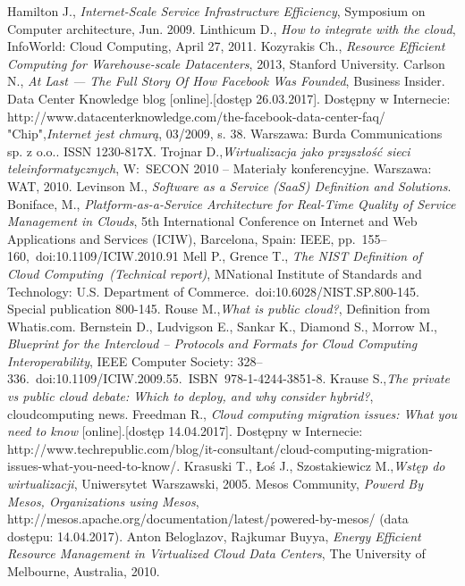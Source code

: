 \documentclass[10pt,a4paper,titlepage,twoside]{report}
\begin{document}
\begin{thebibliography}{99}
Hamilton J., \textit{Internet-Scale Service Infrastructure Efficiency}, Symposium on Computer architecture, Jun. 2009.
Linthicum D., \textit{How to integrate with the cloud}, InfoWorld: Cloud Computing, April 27, 2011.
Kozyrakis Ch., \textit{Resource Efficient Computing for Warehouse-scale Datacenters}, 2013, Stanford University.
Carlson N., \textit{At Last — The Full Story Of How Facebook Was Founded}, Business Insider.
Data Center Knowledge blog [online].[dostęp 26.03.2017]. Dostępny w Internecie: http://www.datacenterknowledge.com/the-facebook-data-center-faq/
"Chip",\textit{Internet jest chmurą}, 03/2009, s. 38. Warszawa: Burda Communications sp. z o.o.. ISSN 1230-817X.
Trojnar D.,\textit{Wirtualizacja jako przyszłość sieci teleinformatycznych}, W: SECON 2010 – Materiały konferencyjne. Warszawa: WAT, 2010.
Levinson M., \textit{Software as a Service (SaaS) Definition and Solutions}.
Boniface, M., \textit{Platform-as-a-Service Architecture for Real-Time Quality of Service Management in Clouds}, 5th International Conference on Internet and Web Applications and Services (ICIW), Barcelona, Spain: IEEE, pp. 155–160, doi:10.1109/ICIW.2010.91
Mell P., Grence T., \textit{The NIST Definition of Cloud Computing (Technical report)}, MNational Institute of Standards and Technology: U.S. Department of Commerce. doi:10.6028/NIST.SP.800-145. Special publication 800-145.
Rouse M.,\textit{What is public cloud?}, Definition from Whatis.com.
Bernstein D., Ludvigson E., Sankar K., Diamond S., Morrow M., \textit{Blueprint for the Intercloud – Protocols and Formats for Cloud Computing Interoperability}, IEEE Computer Society: 328–336. doi:10.1109/ICIW.2009.55. ISBN 978-1-4244-3851-8.
Krause S.,\textit{The private vs public cloud debate: Which to deploy, and why consider hybrid?}, cloudcomputing news.
Freedman R., \textit{Cloud computing migration issues: What you need to know} [online].[dostęp 14.04.2017]. Dostępny w Internecie: http://www.techrepublic.com/blog/it-consultant/cloud-computing-migration-issues-what-you-need-to-know/.
Krasuski T., Łoś J., Szostakiewicz M.,\textit{Wstęp do wirtualizacji}, Uniwersytet Warszawski, 2005. 
Mesos Community, \textit{Powerd By Mesos, Organizations using Mesos}, http://mesos.apache.org/documentation/latest/powered-by-mesos/ (data dostępu: 14.04.2017).
Anton Beloglazov, Rajkumar Buyya, \textit{Energy Efficient Resource Management in Virtualized Cloud Data Centers}, The University of Melbourne, Australia, 2010.

\end{thebibliography}
\end{document}

